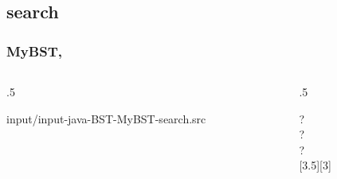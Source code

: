 \documentclass[10pt]{beamer}
\begin{document}
\subsection{search}
\begin{frame}[t]\frametitle{MyBST, }
	\vspace{-0.3cm}
	\begin{columns}[T] %
	\begin{column}{.5\linewidth} %
		{\tiny 
			
				{input/input-java-BST-MyBST-search.src}
		} %
	\end{column} %
	\begin{column}{.5\linewidth} %

		{\tiny 
		\begin{example}
		\begin{center}
			
		\end{center}
		{\scriptsize 		
			 ?\\
			 ?\\				
			 ?\\				
		} %
		\end{example}
		} %
	\end{column} %
	\end{columns} %

\end{frame}
\end{document}
